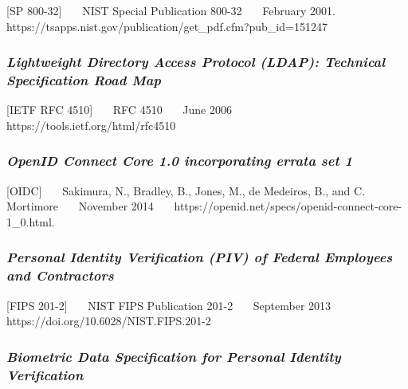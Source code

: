 {[}SP 800-32{]}~~~ NIST Special Publication 800-32~~~ February 2001.~~~
https://tsapps.nist.gov/publication/get\_pdf.cfm?pub\_id=151247~~~

\hypertarget{lightweight-directory-access-protocol-ldap-technical-specification-road-map}{%
\subsubsection{\texorpdfstring{\emph{Lightweight Directory Access Protocol
(LDAP): Technical Specification Road
Map}}{Lightweight Directory Access Protocol (LDAP): Technical Specification Road Map}}\label{lightweight-directory-access-protocol-ldap-technical-specification-road-map}}

{[}IETF RFC 4510{]}~~~ RFC 4510~~~ June 2006~~~
https://tools.ietf.org/html/rfc4510~~~

\hypertarget{openid-connect-core-1.0-incorporating-errata-set-1}{%
\subsubsection{\texorpdfstring{\emph{OpenID Connect Core 1.0 incorporating
errata set
1}}{OpenID Connect Core 1.0 incorporating errata set 1}}\label{openid-connect-core-1.0-incorporating-errata-set-1}}

{[}OIDC{]}~~~ Sakimura, N., Bradley, B., Jones, M., de Medeiros, B., and
C. Mortimore~~~ November 2014~~~
https://openid.net/specs/openid-connect-core-1\_0.html.~~~

\hypertarget{personal-identity-verification-piv-of-federal-employees-and-contractors}{%
\subsubsection{\texorpdfstring{\emph{Personal Identity Verification (PIV) of
Federal Employees and
Contractors}}{Personal Identity Verification (PIV) of Federal Employees and Contractors}}\label{personal-identity-verification-piv-of-federal-employees-and-contractors}}

{[}FIPS 201-2{]}~~~ NIST FIPS Publication 201-2~~~ September 2013~~~
https://doi.org/10.6028/NIST.FIPS.201-2~~~

\hypertarget{biometric-data-specification-for-personal-identity-verification}{%
\subsubsection{\texorpdfstring{\emph{Biometric Data Specification for
Personal Identity
Verification}}{Biometric Data Specification for Personal Identity Verification}}\label{biometric-data-specification-for-personal-identity-verification}}


